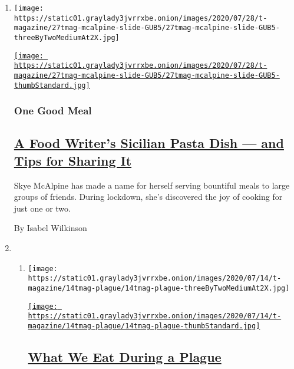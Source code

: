 \begin{enumerate}
\def\labelenumi{\arabic{enumi}.}
\item
  \texttt{[image: https://static01.graylady3jvrrxbe.onion/images/2020/07/28/t-magazine/27tmag-mcalpine-slide-GUB5/27tmag-mcalpine-slide-GUB5-threeByTwoMediumAt2X.jpg]}

  \href{/2020/07/29/t-magazine/skye-mcalpine-pasta-cooking.html}{\texttt{[image: https://static01.graylady3jvrrxbe.onion/images/2020/07/28/t-magazine/27tmag-mcalpine-slide-GUB5/27tmag-mcalpine-slide-GUB5-thumbStandard.jpg]}}

  \hypertarget{one-good-meal}{%
  \subsubsection{One Good Meal}\label{one-good-meal}}

  \hypertarget{a-food-writers-sicilian-pasta-dish--and-tips-for-sharing-it}{%
  \subsection{\texorpdfstring{\href{/2020/07/29/t-magazine/skye-mcalpine-pasta-cooking.html}{A
  Food Writer's Sicilian Pasta Dish --- and Tips for Sharing
  It}}{A Food Writer's Sicilian Pasta Dish --- and Tips for Sharing It}}\label{a-food-writers-sicilian-pasta-dish--and-tips-for-sharing-it}}

  Skye McAlpine has made a name for herself serving bountiful meals to
  large groups of friends. During lockdown, she's discovered the joy of
  cooking for just one or two.

  By Isabel Wilkinson
\item
  \begin{enumerate}
  \def\labelenumii{\arabic{enumii}.}
  \item
    \texttt{[image: https://static01.graylady3jvrrxbe.onion/images/2020/07/14/t-magazine/14tmag-plague/14tmag-plague-threeByTwoMediumAt2X.jpg]}

    \href{/2020/07/16/t-magazine/eating-food-during-plague.html}{\texttt{[image: https://static01.graylady3jvrrxbe.onion/images/2020/07/14/t-magazine/14tmag-plague/14tmag-plague-thumbStandard.jpg]}}

    \hypertarget{what-we-eat-during-a-plague}{%
    \subsection{\texorpdfstring{\href{/2020/07/16/t-magazine/eating-food-during-plague.html}{What
    We Eat During a
    Plague}}{What We Eat During a Plague}}\label{what-we-eat-during-a-plague}}


\end{enumerate}
\end{enumerate}
